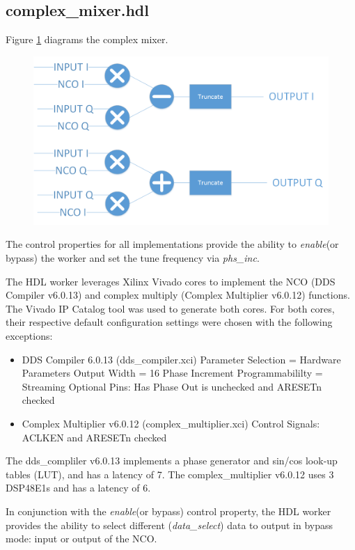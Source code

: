 \documentclass{article}
\def\comp{complex\_mixer}
\begin{document}
\subsection*{\comp.hdl}
\begin{flushleft}
	Figure \ref{fig:complex_mixer} diagrams the complex mixer.\medskip

	\begin{figure}[h]
		\centering\captionsetup{type=figure}\includegraphics[scale=0.4]{complex_mixer_block_diagram}
		\label{fig:complex_mixer}
	\end{figure}

	The control properties for all implementations provide the ability to \textit{enable}(or bypass) the worker and set the tune frequency via \textit{phs\_inc}.\medskip

	The HDL worker leverages Xilinx Vivado cores to implement the NCO (DDS Compiler v6.0.13) and complex multiply (Complex Multiplier v6.0.12) functions. The Vivado IP Catalog tool was used to generate both cores. For both cores, their respective default configuration settings were chosen with the following exceptions:

	\begin{itemize}
		\item DDS Compiler 6.0.13 (dds\_compiler.xci)
			\subitem Parameter Selection = Hardware Parameters
			\subitem Output Width = 16
			\subitem Phase Increment Programmabililty = Streaming
			\subitem Optional Pins: Has Phase Out is unchecked and ARESETn checked
		\item Complex Multiplier v6.0.12 (complex\_multiplier.xci)
			\subitem Control Signals: ACLKEN and ARESETn checked
	\end{itemize}

	The dds\_compliler v6.0.13 implements a phase generator and sin/cos look-up tables (LUT), and has a latency of 7.  The complex\_multiplier v6.0.12 uses 3 DSP48E1s and has a latency of 6.\medskip

	In conjunction with the \textit{enable}(or bypass) control property, the HDL worker provides the ability to select different (\textit{data\_select}) data to output in bypass mode: input or output of the NCO.\medskip
\end{flushleft}
\end{document}
